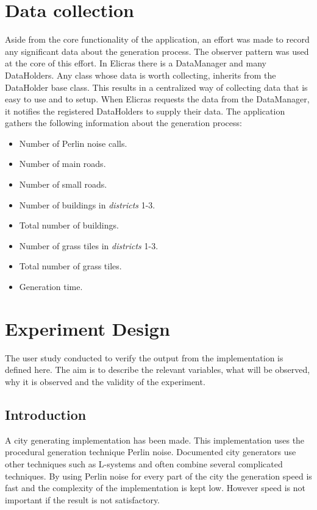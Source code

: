 \section{Data collection}
	Aside from the core functionality of the application, an effort was made to record any significant data about the generation process. The observer pattern was used at the core of this effort. In Elicras there is a DataManager and many DataHolders. Any class whose data is worth collecting, inherits from the DataHolder base class. This results in a centralized way of collecting data that is easy to use and to setup. When Elicras requests the data from the DataManager, it notifies the registered DataHolders to supply their data. The application gathers the following information about the generation process:
	\begin{itemize}
		\item Number of Perlin noise calls.
		\item Number of main roads.
		\item Number of small roads.
		\item Number of buildings in \textit{districts} 1-3.
		\item Total number of buildings.
		\item Number of grass tiles in \textit{districts} 1-3.
		\item Total number of grass tiles.
		\item Generation time.
	\end{itemize}
	
	
\section{Experiment Design}
	The user study conducted to verify the output from the implementation is defined here. The aim is to describe the relevant variables, what will be observed, why it is observed and the validity of the experiment.
	\subsection{Introduction}
	A city generating implementation has been made. This implementation uses the procedural generation technique Perlin noise. Documented city generators use other techniques such as L-systems \cite{ProceduralModeling6} and often combine several complicated techniques. By using Perlin noise for every part of the city the generation speed is fast and the complexity of the implementation is kept low. However speed is not important if the result is not satisfactory.
		
